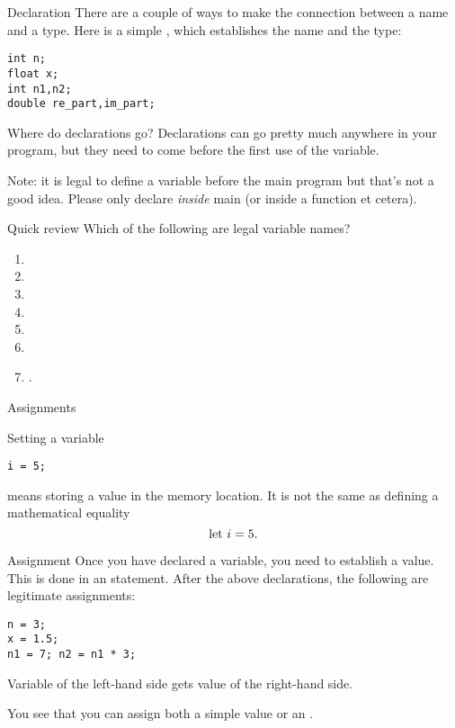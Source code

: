 \begin{block}{Declaration}
  \label{sl:declare-example}
  There are a couple of ways to make the connection between a name and a
  type. Here is a simple
  , which establishes the name
  and the type:
\begin{lstlisting}
int n;
float x;
int n1,n2;
double re_part,im_part;
\end{lstlisting}
\end{block}

\begin{block}{Where do declarations go?}
  \label{sl:declwhere}
  Declarations can go pretty much anywhere in your program, but they need
  to come before the first use of the variable.

  Note: it is legal to define a variable before the main program
  but that's not a good idea. Please only declare \emph{inside} main
  (or inside a function et cetera).
\end{block}

\begin{exercise}{Quick review}
  \label{q:varnames}
  Which of the following are legal variable names?
  \begin{enumerate}
  \item {} \item {} \item {}
  \item {} \item {} \item {} \item {}.
  \end{enumerate}
\end{exercise}

 {Assignments}
\label{c:assign}

Setting a variable
\begin{lstlisting}
i = 5;
\end{lstlisting}
means storing a value in the memory location. It is
not the same as defining a mathematical equality
\[ \hbox{let $i=5$}. \]

\begin{block}{Assignment}
  \label{sl:assign1}
  Once you have declared a variable, you need to establish a value. This is done in an
   statement. After the above declarations, the
  following are legitimate assignments:
\begin{lstlisting}
n = 3;
x = 1.5;
n1 = 7; n2 = n1 * 3;
\end{lstlisting}
Variable of the left-hand side gets value of the right-hand side.

You see that you can assign both a simple value or an
.
\end{block}

